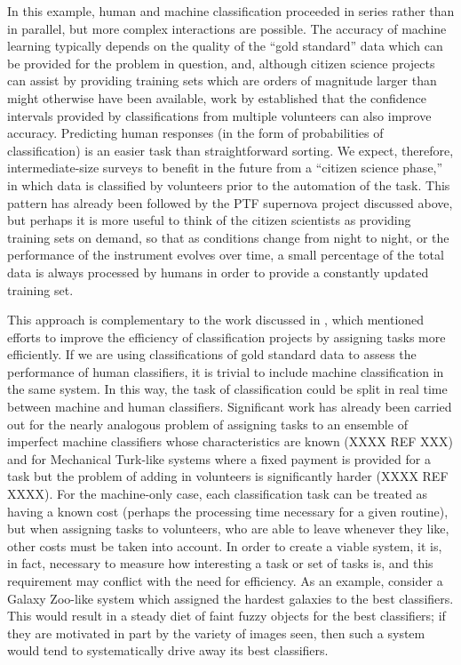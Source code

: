 \documentclass{ar2e}
\begin{document}
In this example, human and machine classification proceeded in series rather
than in parallel, but more complex interactions are possible. The accuracy of
machine learning typically depends on the quality of the ``gold standard'' data
which can be provided for the problem in question, and, although citizen science
projects can assist by providing training sets which are orders of magnitude
larger than might otherwise have been available, work by \citet{Banerji}
established that the confidence intervals provided by classifications from
multiple volunteers can also improve accuracy. Predicting human responses (in
the form of probabilities of classification) is an easier task than
straightforward sorting. We expect, therefore, intermediate-size surveys to
benefit in the future from a ``citizen science phase,'' in which data is
classified by volunteers prior to the automation of the task. This pattern has
already been followed by the PTF supernova project discussed above, but perhaps
it is more useful to think of the citizen scientists as providing training sets
on demand, so that as conditions change from night to night, or the performance
of the instrument evolves over time, a small percentage of the total data is
always processed by humans in order to provide a constantly updated training
set. 

This approach is complementary to the work discussed in
, which mentioned efforts to improve the efficiency of
classification projects by assigning tasks more efficiently. If we are using
classifications of gold standard data to assess the performance of human
classifiers, it is trivial to include machine classification in the same system.
In this way, the task of classification could be split in real time between
machine and human classifiers. Significant work has already been carried out for
the nearly analogous problem of assigning tasks to an ensemble of imperfect
machine classifiers whose characteristics are known (XXXX REF XXX) and for
Mechanical Turk-like systems where a fixed payment is provided for a task but
the problem of adding in volunteers is significantly harder (XXXX REF XXXX). For
the machine-only case, each classification task can be treated as having a known
cost (perhaps the processing time necessary for a given routine), but when
assigning tasks to  volunteers, who are able to leave whenever they like, other
costs must be taken into account. In order to create a viable system, it is, in
fact, necessary to measure how interesting a task or set of tasks is, and this
requirement may conflict with the need for efficiency. As an example, consider a
Galaxy Zoo-like system which assigned the hardest galaxies to the best
classifiers. This would result in a steady diet of faint fuzzy objects for the
best classifiers; if they are motivated in part by the variety of images seen,
then such a system would tend to systematically drive away its best
classifiers. 
\end{document}
